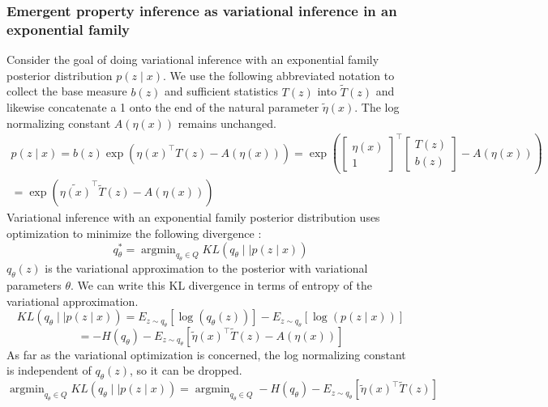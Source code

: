 \documentclass[11pt]{article}
\DeclareMathOperator*{\argmin}{argmin}
\begin{document}
\subsubsection{Emergent property inference as variational inference in an exponential family}\label{methods_VI}
Consider the goal of doing variational inference with an exponential family posterior distribution $p(z \mid x)$.  We use the following abbreviated notation to collect the base measure $b(z)$ and sufficient statistics $T(z)$ into $\tilde{T}(z)$ and likewise concatenate a 1 onto the end of the natural parameter $\tilde{\eta}(x)$.  The log normalizing constant $A(\eta(x))$ remains unchanged.
\begin{equation}
\begin{split}
p(z \mid x) = b(z) \exp{\left( \eta(x)^\top T(z) - A(\eta(x)) \right)} = \exp{\left( \begin{bmatrix} \eta(x) \\ 1 \end{bmatrix}^\top \begin{bmatrix} T(z) \\ b(z) \end{bmatrix} - A(\eta(x)) \right)} \\= \exp{\left(\tilde{\eta(x)}^\top \tilde{T}(z) - A(\eta(x)) \right)} 
\end{split}
\end{equation}
Variational inference with an exponential family posterior distribution uses optimization to minimize the following divergence \cite{blei2017variational}:
\begin{equation}
q_\theta^* = \argmin_{q_\theta \in Q} KL(q_\theta \mid \mid p(z \mid x))
\end{equation}
$q_\theta(z)$ is the variational approximation to the posterior with variational parameters $\theta$.  We can write this KL divergence in terms of entropy of the variational approximation.
\begin{equation}
KL(q_\theta \mid \mid p(z \mid x)) = E_{z \sim q_\theta} \left[ \log (q_\theta(z)) \right] - E_{z \sim q_\theta} \left[ \log (p(z \mid x)) \right]
\end{equation}
\begin{equation}
 = -H(q_\theta) - E_{z \sim q_\theta} \left[ \tilde{\eta}(x)^\top  \tilde{T}(z) - A(\eta(x)) \right]
\end{equation}
As far as the variational optimization is concerned, the log normalizing constant is independent of $q_\theta(z)$, so it can be dropped. 
\begin{equation}
\argmin_{q_\theta \in Q} KL(q_\theta \mid \mid p(z \mid x)) =  \argmin_{q_\theta \in Q} -H(q_\theta) - E_{z \sim q_\theta} \left[ \tilde{\eta}(x)^\top  \tilde{T}(z) \right]
\end{equation}
\end{document}
